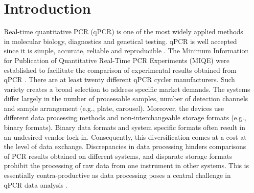 \documentclass{bioinfo}
\begin{document}
\section{Introduction}
Real-time quantitative PCR (qPCR) is one of the most  widely applied methods in molecular 
biology, diagnostics and  genetical testing. qPCR is well accepted since 
it is simple, accurate, reliable and reproducible \cite{pabinger_2014}. The 
Minimum Information for Publication of Quantitative Real-Time PCR Experiments (MIQE) were established to facilitate the comparison of experimental results obtained from qPCR 
\cite{huggett_2013}. There are at least twenty different qPCR cycler manufacturers. Such variety creates a broad selection to 
address specific market demands. The systems differ largely in  the 
number of processable samples, number of detection channels and sample 
arrangement (e.g., plate, carousel). Moreover, the devices use different 
data processing methods and non-interchangeable storage formats (e.g., binary formats). 
Binary data formats and system specific formats often result in  an undesired vendor 
lock-in. Consequently, this diversification comes at a cost at the level of data 
exchange. Discrepancies in data processing hinders  comparisons of PCR results 
obtained on different systems, and disparate storage formats prohibit the processing 
of raw data from one instrument in other systems. This is essentially contra-productive as data processing  poses a 
central challenge in qPCR data analysis \cite{bustin_reproducibility_2014, roediger2015r, 
spiess_impact_2014, spiess_system-specific_2016}.
\end{document}
